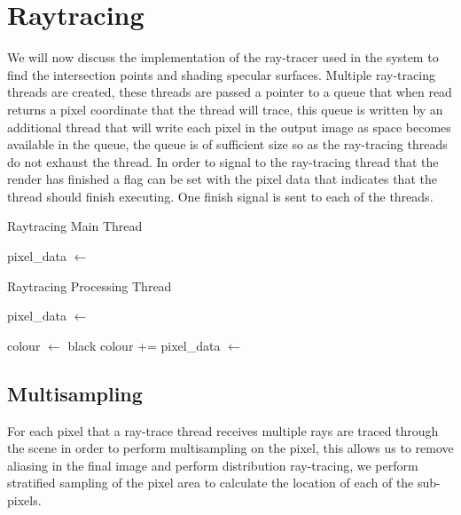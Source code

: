 \section{Raytracing}
We will now discuss the implementation of the ray-tracer used in the system to find the intersection points and shading specular
surfaces. Multiple ray-tracing threads are created, these threads are passed a pointer to a queue that when read returns a
pixel coordinate that the thread will trace, this queue is written by an additional thread that will write each pixel in the
output image as space becomes available in the queue, the queue is of sufficient size so as the ray-tracing threads do not
exhaust the thread. In order to signal to the ray-tracing thread that the render has finished a flag can be set with the pixel
data that indicates that the thread should finish executing. One finish signal is sent to each of the threads.

\begin{algorithm}
\begin{algorithmic}
\caption{Raytracing Main Thread}
	\State {}
\EndFor

	\State pixel\_data $\gets$ 
	\State {}
\EndFor

\end{algorithmic}
\end{algorithm}

\begin{algorithm}
\begin{algorithmic}
\caption{Raytracing Processing Thread}

\State pixel\_data  $\gets$ 

	\State colour $\gets$ black
		\State colour += 
	\EndFor
	\State {}
	\State pixel\_data  $\gets$ 
\EndWhile

\end{algorithmic}
\end{algorithm}

\subsection{Multisampling}
For each pixel that a ray-trace thread receives multiple rays are traced through the scene in order to perform multisampling
on the pixel, this allows us to remove aliasing in the final image and perform distribution ray-tracing, we perform stratified
sampling of the pixel area to calculate the location of each of the sub-pixels.

